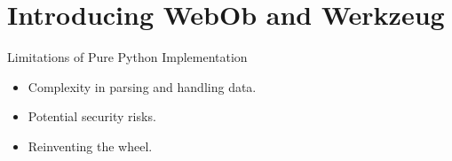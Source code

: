 \documentclass{beamer}
\begin{document}
\section{Introducing WebOb and Werkzeug}

\begin{frame}{Limitations of Pure Python Implementation}
    \begin{itemize}
        \item Complexity in parsing and handling data.
        \item Potential security risks.
        \item Reinventing the wheel.
    \end{itemize}
\end{frame}

%
%
%
\end{document}
